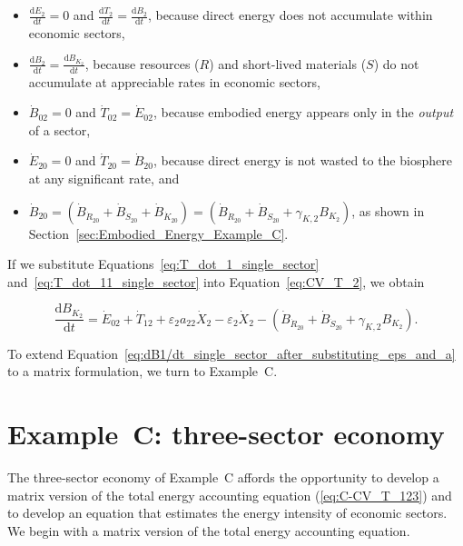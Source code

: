 \begin{itemize}
	\item{$\frac{\mathrm{d}E_2}{\mathrm{d}t} = 0$
		and
		$\frac{\mathrm{d}T_2}{\mathrm{d}t} = \frac{\mathrm{d}B_2}{\mathrm{d}t}$, 
		because direct energy
		does not accumulate within economic sectors,}
	\item{$\frac{\mathrm{d}B_2}{\mathrm{d}t} = \frac{\mathrm{d}B_{K_{2}}}{\mathrm{d}t}$,
		because resources ($R$) and short-lived materials ($S$) do not 
		accumulate at appreciable rates in economic sectors,}
	\item{$\dot{B}_{02} = 0$ and $\dot{T}_{02} = \dot{E}_{02}$,
		because embodied energy appears only in the \emph{output} of a sector,}
	\item{$\dot{E}_{20} = 0$ and $\dot{T}_{20} = \dot{B}_{20}$, 
	because direct energy is not wasted to the biosphere at any significant rate, and} 
	\item{$\dot{B}_{20} = \left( \dot{B}_{\dot{R}_{20}} 
							+ \dot{B}_{\dot{S}_{20}}
							+ \dot{B}_{\dot{K}_{20}}
							\right)
						= \left( \dot{B}_{\dot{R}_{20}} 
							+ \dot{B}_{\dot{S}_{20}}
							+ \gamma_{K,2} B_{K_{2}}
							\right)$, as shown in Section~\ref{sec:Embodied_Energy_Example_C}.}
\end{itemize}

\noindent{}If we substitute Equations~\ref{eq:T_dot_1_single_sector} 
and~\ref{eq:T_dot_11_single_sector} into Equation~\ref{eq:CV_T_2}, we obtain

\begin{equation} \label{eq:dB1/dt_single_sector_after_substituting_eps_and_a}
	\frac{\mathrm{d}B_{K_{2}}}{\mathrm{d}t} 
	= \dot{E}_{02} 
	+ \dot{T}_{12}
	+ \varepsilon_{2}a_{22}\dot{X}_{2} 
	- \varepsilon_{2}\dot{X}_{2} 
	- \left( \dot{B}_{\dot{R}_{20}} 
							+ \dot{B}_{\dot{S}_{20}}
							+ \gamma_{K,2} B_{K_{2}}
							\right).
\end{equation}

To extend Equation~\ref{eq:dB1/dt_single_sector_after_substituting_eps_and_a}
to a matrix formulation, we turn to Example~C.


\section{Example~C: three-sector economy} %
\label{sec:C-intensity}

The three-sector economy of Example~C affords the opportunity 
to develop a matrix version 
of the total energy accounting equation (\ref{eq:C-CV_T_123})
and to develop an equation that estimates the
energy intensity of economic sectors. 
We begin with a matrix version of the total energy accounting equation.


